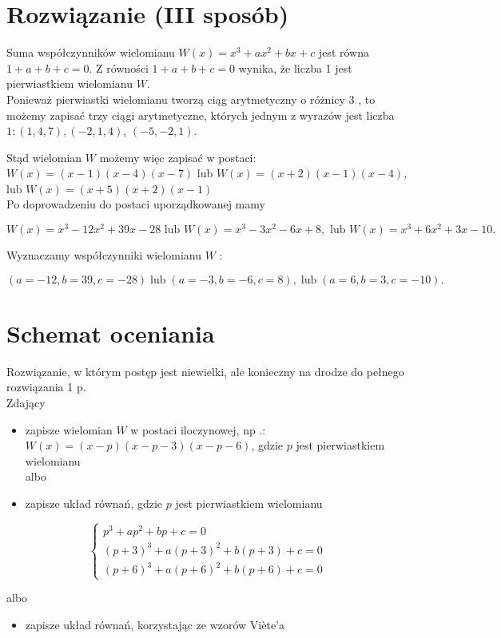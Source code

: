 \documentclass[10pt]{article}
\begin{document}
\section*{Rozwiązanie (III sposób)}
Suma współczynników wielomianu $W(x)=x^{3}+a x^{2}+b x+c$ jest równa $1+a+b+c=0$. Z równości $1+a+b+c=0$ wynika, że liczba 1 jest pierwiastkiem wielomianu $W$.\\
Ponieważ pierwiastki wielomianu tworzą ciąg arytmetyczny o różnicy 3 , to możemy zapisać trzy ciągi arytmetyczne, których jednym z wyrazów jest liczba $1:(1,4,7),(-2,1,4)$, $(-5,-2,1)$.

Stąd wielomian $W$ możemy więc zapisać w postaci:\\
$W(x)=(x-1)(x-4)(x-7)$ lub $W(x)=(x+2)(x-1)(x-4)$,\\
lub $W(x)=(x+5)(x+2)(x-1)$\\
Po doprowadzeniu do postaci uporządkowanej mamy

$$
W(x)=x^{3}-12 x^{2}+39 x-28 \text { lub } W(x)=x^{3}-3 x^{2}-6 x+8, \text { lub } W(x)=x^{3}+6 x^{2}+3 x-10 .
$$

Wyznaczamy współczynniki wielomianu $W$ :

$$
(a=-12, b=39, c=-28) \operatorname{lub}(a=-3, b=-6, c=8), \operatorname{lub}(a=6, b=3, c=-10) .
$$

\section*{Schemat oceniania}
Rozwiązanie, w którym postęp jest niewielki, ale konieczny na drodze do pełnego rozwiązania 1 p.\\
Zdający

\begin{itemize}
  \item zapisze wielomian $W$ w postaci iloczynowej, np .: $W(x)=(x-p)(x-p-3)(x-p-6)$, gdzie $p$ jest pierwiastkiem wielomianu\\
albo
  \item zapisze układ równań, gdzie $p$ jest pierwiastkiem wielomianu
\end{itemize}

$$
\left\{\begin{array}{l}
p^{3}+a p^{2}+b p+c=0 \\
(p+3)^{3}+a(p+3)^{2}+b(p+3)+c=0 \\
(p+6)^{3}+a(p+6)^{2}+b(p+6)+c=0
\end{array}\right.
$$

albo

\begin{itemize}
  \item zapisze układ równań, korzystając ze wzorów Viète’a
\end{itemize}
\end{document}
